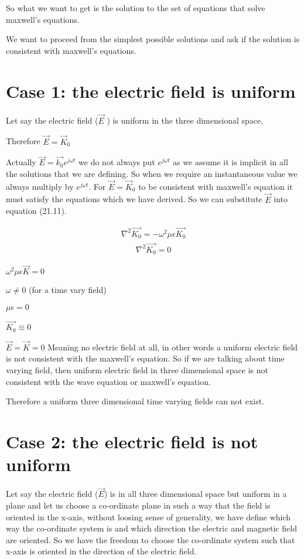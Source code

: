 So what we want to get is the solution to the set of equations that solve maxwell's equations.

We want to proceed from the simplest possible solutions and ask if the solution is consistent with maxwell's equations.

\section{Case 1: the electric field is uniform}

Let say the electric field ($\vec{E}$ ) is uniform in the three dimensional space,

Therefore $\vec{E}=\vec{K}_{0}$

Actually $\vec{E}=\vec{k_{0}}e^{j\omega t}$ we do not always put  $e^{j\omega t}$ as we assume it is implicit in all the solutions that we are defining. So when we require an instantaneous value we always multiply by $e^{j\omega t}$. For $\vec{E}=\vec{K}_{0}$ to be consistent with maxwell's equation it must satisfy the equations which we have derived. So we can substitute $\vec{E}$ into equation (21.11).

\begin{align}
\nabla^2\vec{K_{0}}=-\omega^2\mu\epsilon\vec{K_{0}}
\end{align}
\begin{align}
\nabla^2\vec{K_{0}}=0
\end{align}

$\omega^2\mu\epsilon\vec{K}=0$

$\omega\neq0$ (for a time vary field)

$\mu\epsilon=0$

$\vec{K_{0}}\equiv0$

$\vec{E}=\vec{K}=0$ Meaning no electric field at all, in other words a uniform electric field is not consistent with the maxwell's equation. So if we are talking about time varying field, then uniform electric field in three dimensional space is not consistent with the wave equation or maxwell's equation.

Therefore a uniform three dimensional time varying fields can not exist.

\section{Case 2: the electric field is not uniform}
Let say the electric field ($\vec{E}$) is in all three dimensional space but uniform in a plane and let us choose a co-ordinate plane in such a way that the field is oriented in the x-axis, without loosing sense of generality, we have define which way the co-ordinate system is and which direction the electric and magnetic field are oriented. So we have the freedom to choose the co-ordinate system such that x-axis is oriented in the direction of the electric field.

